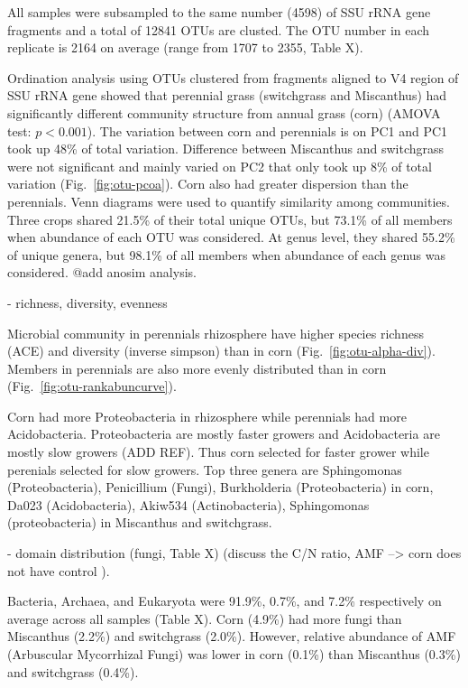\documentclass[12pt]{article}
\begin{document}
All samples were subsampled to the same number (4598) of SSU rRNA gene fragments and a total of 12841 OTUs are clusted. The OTU number in each replicate is 2164 on average (range from 1707 to 2355, Table X).

Ordination analysis using OTUs clustered from fragments aligned to V4 region of SSU rRNA gene showed that perennial grass (switchgrass and Miscanthus) had significantly different community structure from annual grass (corn) (AMOVA test: $p < 0.001$). The variation between corn and perennials is on PC1 and PC1 took up 48\% of total variation. Difference between Miscanthus and switchgrass were not significant and mainly varied on PC2 that only took up 8\% of total variation (Fig.~\ref{fig:otu-pcoa}). Corn also had greater dispersion than the perennials. Venn diagrams were used to quantify similarity among communities. Three crops shared 21.5\% of their total unique OTUs, but 73.1\% of all members when abundance of each OTU was considered. At genus level, they shared 55.2\% of unique genera, but 98.1\% of all members when abundance of each genus was considered. @add anosim analysis.

- richness, diversity, evenness

Microbial community in perennials rhizosphere have higher species richness (ACE) and diversity (inverse simpson) than in corn (Fig.~\ref{fig:otu-alpha-div}). Members in perennials are also more evenly distributed than in corn (Fig.~\ref{fig:otu-rankabuncurve}).

Corn had more Proteobacteria in rhizosphere while perennials had more Acidobacteria. Proteobacteria are mostly faster growers and Acidobacteria are mostly slow growers (ADD REF). Thus corn selected for faster grower while perenials selected for slow growers. Top three genera are Sphingomonas (Proteobacteria), Penicillium (Fungi), Burkholderia (Proteobacteria) in corn, Da023 (Acidobacteria), Akiw534 (Actinobacteria), Sphingomonas (proteobacteria) in Miscanthus and switchgrass.

- domain distribution (fungi, Table X) (discuss the C/N ratio, AMF --> corn does not have control ).

Bacteria, Archaea, and Eukaryota were 91.9\%, 0.7\%, and 7.2\% respectively on average across all samples (Table X). Corn (4.9\%) had more fungi than Miscanthus (2.2\%) and switchgrass (2.0\%). However, relative abundance of AMF (Arbuscular Mycorrhizal Fungi) was lower in corn (0.1\%) than Miscanthus (0.3\%) and switchgrass (0.4\%).
  
\end{document}
